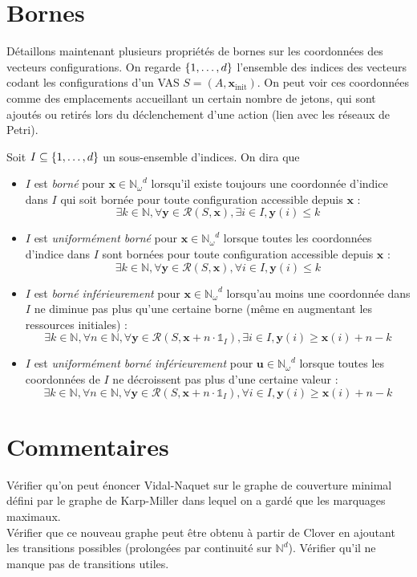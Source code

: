 \documentclass[a4paper,final]{article}
\theoremstyle{definition}
\let\leq\leqslant
\let\geq\geqslant
\newcommand{\os}[1]{\left\{\mathinner{#1}\right\}}
\newcommand{\N}{\ensuremath{\mathbb{N}}}
\newcommand{\Nomega}{\ensuremath{\mathbb{N}_\omega}}
\newcommand{\indicatrice}[1]{\ensuremath{\mathds{1}_{#1}}}
\newcommand{\conf}{\ensuremath{\mathcal{R}}}
\newcommand{\vect}[1]{\ensuremath{\mathbf{#1}}}
\newcommand{\xinit}{\ensuremath{\vect{x}_\text{init}}}
\begin{document}

\section{Bornes}

Détaillons maintenant plusieurs propriétés de bornes sur les coordonnées des vecteurs configurations.
On regarde $\os{1,\dots,d}$ l'ensemble des indices des vecteurs codant les configurations d'un VAS $S=(A,\xinit)$.
On peut voir ces coordonnées comme des emplacements accueillant un certain nombre de jetons, qui sont ajoutés ou retirés lors du déclenchement d'une action (lien avec les réseaux de Petri).

Soit $I\subseteq \os{1,\dots,d}$ un sous-ensemble d'indices.
On dira que
\begin{itemize}
    \item $I$ est \emph{borné} pour $\vect{x}\in \Nomega^d$ lorsqu'il existe toujours une coordonnée d'indice dans $I$ qui soit bornée pour toute configuration accessible depuis $\vect{x}$ :
    $$\exists k\in\N, \forall \vect{y}\in\conf(S,\vect{x}), \exists i\in I, \vect{y}(i)\leq k$$
    
    \item $I$ est \emph{uniformément borné} pour $\vect{x}\in \Nomega^d$ lorsque toutes les coordonnées d'indice dans $I$ sont bornées pour toute configuration accessible depuis $\vect{x}$ :
    $$\exists k\in\N, \forall \vect{y}\in\conf(S,\vect{x}), \forall i\in I, \vect{y}(i)\leq k$$
    
    \item $I$ est \emph{borné inférieurement} pour $\vect{x}\in \Nomega^d$ lorsqu'au moins une coordonnée dans $I$ ne diminue pas plus qu'une certaine borne (même en augmentant les ressources initiales) :
    $$\exists k\in\N, \forall n\in\N, \forall \vect{y}\in\conf(S,\vect{x} + n\cdot\indicatrice{I}), \exists i\in I, \vect{y}(i)\geq \vect{x}(i)+n-k$$
    
    \item $I$ est \emph{uniformément borné inférieurement} pour $\vect{u}\in \Nomega^d$ lorsque toutes les coordonnées de $I$ ne décroissent pas plus d'une certaine valeur :
    $$\exists k\in\N, \forall n\in\N, \forall \vect{y}\in\conf(S,\vect{x} + n\cdot\indicatrice{I}), \forall i\in I, \vect{y}(i)\geq \vect{x}(i)+n-k$$
\end{itemize}

\section{Commentaires}
Vérifier qu'on peut énoncer Vidal-Naquet sur le graphe de couverture minimal défini par le graphe de Karp-Miller dans lequel on a gardé que les marquages maximaux.\\
Vérifier que ce nouveau graphe peut être obtenu à partir de Clover en ajoutant les transitions possibles (prolongées par continuité sur $\N^d$). Vérifier qu'il ne manque pas de transitions utiles.
\end{document}
